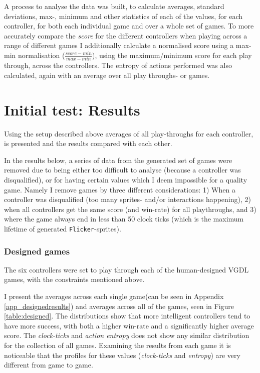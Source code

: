 \documentclass[a4paper,titlepage,final]{report}
\begin{document}
A process to analyse the data was built, to calculate averages, standard deviations, max-, minimum and other statistics of each of the values, for each controller, for both each individual game and over a whole set of games.
To more accurately compare the \textit{score} for the different controllers when playing across a range of different games  I additionally calculate a normalised score using a max-min normalisation ($\frac{score-min}{max-min}$), using the maximum/minimum score for each play through, across the controllers. 
The entropy of actions performed was also calculated, again with an average over all play throughs- or games.

\section{Initial test: Results}
\label{sec_task1inittestresults}
Using the setup described above averages of all play-throughs for each controller, is presented and the results compared with each other.

In the results below, a series of data from the generated set of games were removed due to being either too difficult to analyse (because a controller was disqualified), or for having certain values which I deem impossible for a quality game.
Namely I remove games by three different considerations: 
1) When a controller was disqualified (too many sprites- and/or interactions happening), 2) when all controllers get the same score (and win-rate) for all playthroughs, and 3) where the game always end in less than 50 clock ticks (which is the maximum lifetime of generated \texttt{Flicker}-sprites).

\subsubsection*{Designed games}
The six controllers were set to play through each of the human-designed VGDL games, with the constraints mentioned above.

I present the averages across each single game(can be seen in Appendix \ref{app_designedresults}) and averages across all of the games, seen in Figure \ref{table:designed}.
The distributions show that more intelligent controllers tend to have more success, with both a higher win-rate and a significantly higher average score. 
The \textit{clock-ticks} and \textit{action entropy} does not show any similar distribution for the collection of all games. 
Examining the results from each game it is noticeable that the profiles for these values (\textit{clock-ticks} and \textit{entropy}) are very different from game to game.
\end{document}
